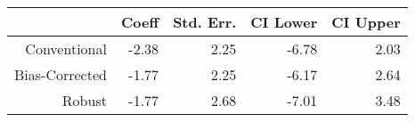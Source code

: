\begin{tabular}{rrrrr}
  \hline
 & Coeff & Std. Err. & CI Lower & CI Upper \\ 
  \hline
Conventional & -2.38 & 2.25 & -6.78 & 2.03 \\ 
  Bias-Corrected & -1.77 & 2.25 & -6.17 & 2.64 \\ 
  Robust & -1.77 & 2.68 & -7.01 & 3.48 \\ 
   \hline
\end{tabular}
